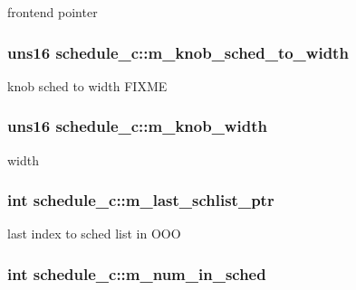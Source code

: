 \label{classschedule__c_a88ee09e9569c248374f0c943a4b73987}
frontend pointer \hypertarget{classschedule__c_a92d6480db2a509909d356fc6b10d5d73}{
\subsubsection[{m\_\-knob\_\-sched\_\-to\_\-width}]{\setlength{\rightskip}{0pt plus 5cm}uns16 {\bf schedule\_\-c::m\_\-knob\_\-sched\_\-to\_\-width}}}
\label{classschedule__c_a92d6480db2a509909d356fc6b10d5d73}
knob sched to width FIXME \hypertarget{classschedule__c_a64a19cfe161bf6e7833bb8133849da67}{
\subsubsection[{m\_\-knob\_\-width}]{\setlength{\rightskip}{0pt plus 5cm}uns16 {\bf schedule\_\-c::m\_\-knob\_\-width}}}
\label{classschedule__c_a64a19cfe161bf6e7833bb8133849da67}
width \hypertarget{classschedule__c_abfdb3ae734434b3a86c2402cf3d7e22c}{
\subsubsection[{m\_\-last\_\-schlist\_\-ptr}]{\setlength{\rightskip}{0pt plus 5cm}int {\bf schedule\_\-c::m\_\-last\_\-schlist\_\-ptr}}}
\label{classschedule__c_abfdb3ae734434b3a86c2402cf3d7e22c}
last index to sched list in OOO \hypertarget{classschedule__c_a28362ea19de72375832f204b8d447237}{
\subsubsection[{m\_\-num\_\-in\_\-sched}]{\setlength{\rightskip}{0pt plus 5cm}int {\bf schedule\_\-c::m\_\-num\_\-in\_\-sched}}}
